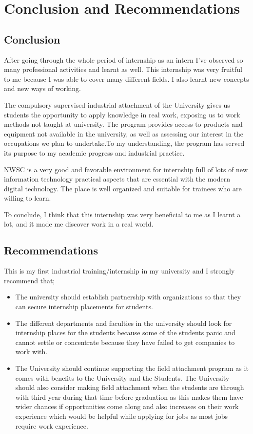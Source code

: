 \documentclass{article}
\begin{document}
\section{Conclusion and Recommendations}
\subsection{Conclusion}
After going through the whole period of internship as an intern I’ve observed so many professional activities and learnt as well. This internship was very fruitful to me because I was able  to cover many different fields. I also learnt new concepts and new ways of working.
\par The compulsory supervised industrial attachment of the University gives us  students  the opportunity to apply knowledge in real work, exposing us to work methods not taught at university. The program provides access to products and equipment not available in the university, as well as assessing our interest in the occupations we plan to undertake.To my understanding, the program has served its purpose to my academic progress and industrial practice.
\par NWSC  is a very good and favorable environment for internship full of lots of new information technology practical aspects that are essential with the modern digital technology. The place is well organized and suitable for trainees who are willing to learn.
\par To conclude, I think that this internship was very beneficial to me as I learnt a lot, and it made me discover work in a real world.
\subsection{Recommendations}
This is my first industrial training/internship in my university and I strongly recommend that;
\begin{itemize}
\item The university should establish partnership with organizations so that they can secure internship placements for students.
\item The different departments and faculties in the university should look for internship places for the students because some of the students panic and cannot settle or concentrate because they have failed to get companies to work with.
\item The University should continue supporting the field attachment program as it comes with benefits to the University and the Students. The University should also consider making field attachment when the students are through with third year during that time before graduation  as this makes them have wider chances if opportunities come along and also increases on their work experience which would be helpful while applying for jobs as most jobs require work experience.
\end{itemize}
\newpage
\end{document}
